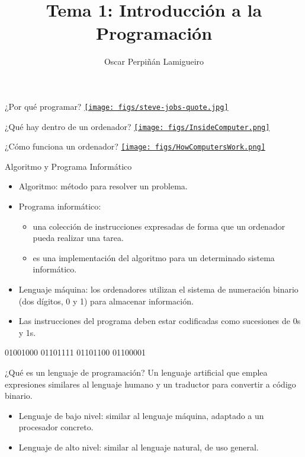 \documentclass[xcolor={usenames,svgnames,dvipsnames}, aspectratio=169]{beamer}
\author{Oscar Perpiñán Lamigueiro}
\date{}
\title{Tema 1: Introducción a la Programación}
\begin{document}
\maketitle

\begin{frame}[label={sec:orgc01e6fa},plain]{¿Por qué programar?}
\href{https://www.youtube.com/watch?v=QvyTEx1wyOY}{\texttt{[image: figs/steve-jobs-quote.jpg]}}
\end{frame}

\begin{frame}[label={sec:org804c2a3},plain]{¿Qué hay dentro de un ordenador?}
\href{http://www.gcflearnfree.org/computerbasics/inside-a-computer/1/}{\texttt{[image: figs/InsideComputer.png]}}
\end{frame}

\begin{frame}[label={sec:org912da76},plain]{¿Cómo funciona un ordenador?}
\href{https://youtu.be/DKGZlaPlVLY?t=42}{\texttt{[image: figs/HowComputersWork.png]}}
\end{frame}

\begin{frame}[label={sec:org837a026}]{Algoritmo y Programa Informático}
\begin{itemize}
\item \alert{Algoritmo}: método para resolver un problema.
\item \alert{Programa informático}:
\begin{itemize}
\item una colección de instrucciones expresadas de forma que un ordenador pueda realizar una tarea.
\item es una implementación del algoritmo para un determinado sistema informático.
\end{itemize}
\item \alert{Lenguaje máquina}: los ordenadores utilizan el sistema de numeración binario (dos dígitos, 0 y 1) para almacenar información.
\item Las instrucciones del programa deben estar codificadas como sucesiones de 0s y 1s.
\end{itemize}
\begin{center}
01001000 01101111 01101100 01100001
\end{center}
\end{frame}

\begin{frame}[label={sec:org7aefee8}]{¿Qué es un lenguaje de programación?}
Un lenguaje artificial que emplea \alert{expresiones similares al lenguaje humano} y un \alert{traductor} para convertir a código binario.
\begin{itemize}
\item Lenguaje de \alert{bajo nivel}: similar al lenguaje máquina, adaptado a un procesador concreto.
\item Lenguaje de \alert{alto nivel}: similar al lenguaje natural, de uso general.
\end{itemize}
\end{frame}
\end{document}
